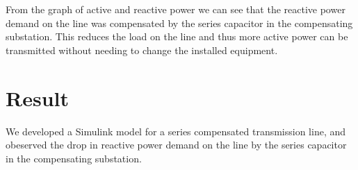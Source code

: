 \documentclass[12pt]{article}
\begin{document}
  From the graph of active and reactive power we can see that the reactive power demand on the line
  was compensated by the series capacitor in the compensating substation. This reduces the load on the 
  line and thus more active power can be transmitted without needing to change the installed equipment.

  \section{Result}
  We developed a Simulink model for a series compensated transmission line, and obeserved the drop
  in reactive power demand on the line by the series capacitor in the compensating substation.
\end{document}
